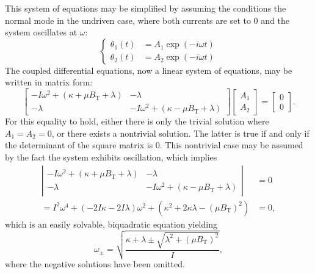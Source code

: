 \documentclass{article}
\begin{document}
This system of equations may be simplified by assuming the conditions the normal mode in the undriven case, where both currents are set to 0 and the system oscillates at $\omega$:
\begin{equation*}
  \begin{cases}
    \theta_1(t) &= A_1 \exp(-i\omega t) \\
    \theta_2(t) &= A_2 \exp(-i\omega t)
  \end{cases}
\end{equation*}
The coupled differential equations, now a linear system of equations, may be written in matrix form:
\begin{equation*}
  \left[
    \begin{matrix}
      -I\omega^2+(\kappa + \mu B_\text{T} + \lambda)   &   -\lambda \\
      -\lambda                                    &   -I\omega^2+(\kappa - \mu B_\text{T} + \lambda)
  \end{matrix} \right]\left[
    \begin{matrix} A_1 \\ A_2
  \end{matrix} \right] = \left[
    \begin{matrix} 0\\0
  \end{matrix} \right].
\end{equation*}
For this equality to hold, either there is only the trivial solution where $A_1=A_2=0$, or there exists a nontrivial solution. The latter is true if and only if the determinant of the square matrix is 0.
This nontrivial case may be assumed by the fact the system exhibits oscillation, which implies
\begin{equation*}
  \begin{aligned}
    \left|
    \begin{matrix}
      -I\omega^2+(\kappa + \mu B_\text{T} + \lambda)   &   -\lambda \\
      -\lambda                                    &   -I\omega^2+(\kappa - \mu B_\text{T} + \lambda)
    \end{matrix} \right| &= 0 \\
    = I^2 \omega^4 + \left(-2I\kappa-2I\lambda \right)\omega^2 + \left(\kappa^2 + 2\kappa\lambda - (\mu B_\text{T})^2\right) &= 0,
  \end{aligned}
\end{equation*}
which is an easily solvable, biquadratic equation yielding
\begin{equation}
  \omega_\pm = \sqrt{\frac{\kappa+\lambda \pm \sqrt{\lambda^2 + \left(\mu B_\text{T}\right)^2}}{I}},\label{eq:omegar}
\end{equation}
where the negative solutions have been omitted.
\end{document}
